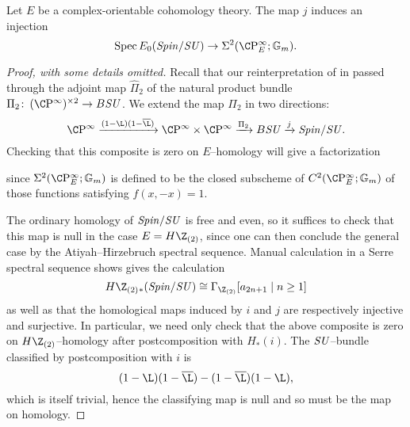 \begin{lemma}\label{SpinSUComparisonMapIsInj}
Let $E$ be a complex-orientable cohomology theory.  The map $j$ induces an injection \[\Spec E_0(\Spin/\SU) \to \Sigma^2(\CP^\infty_E; \Gm).\]
\end{lemma}
\begin{proof}[Proof, with some details omitted]
Recall that our reinterpretation of  in  passed through the adjoint map $\widehat \Pi_2$ of the natural product bundle $\Pi_2\co (\CP^\infty)^{\times 2} \to B\SU$.  We extend the map $\Pi_2$ in two directions: \[\CP^\infty \xrightarrow{(1 - \L)(1 - \overline{\L})} \CP^\infty \times \CP^\infty \xrightarrow{\Pi_2} B\SU \xrightarrow{j} \Spin/\SU.\]  Checking that this composite is zero on $E$--homology will give a factorization
\begin{center}
\end{center}
since $\Sigma^2(\CP^\infty_E; \Gm)$ is defined to be the closed subscheme of $C^2(\CP^\infty_E; \Gm)$ of those functions satisfying $f(x, -x) = 1$.

The ordinary homology of $\mathit{Spin}/\mathit{SU}$ is free and even, so it suffices to check that this map is null in the case $E = H\Z_{(2)}$, since one can then conclude the general case by the Atiyah--Hirzebruch spectral sequence.  Manual calculation in a Serre spectral sequence shows gives the calculation \[H\Z_{(2)}{}_*(\Spin/\SU) \cong \Gamma_{\Z_{(2)}}[a_{2n+1} \mid n \ge 1]\] as well as that the homological maps induced by $i$ and $j$ are respectively injective and surjective.  In particular, we need only check that the above composite is zero on $H\Z_{(2)}$--homology after postcomposition with $H_*(i)$.  The $\mathit{SU}$--bundle classified by postcomposition with $i$ is \[(1 - \L)(1 - \overline \L) - (1 - \overline \L)(1 - \L),\] which is itself trivial, hence the classifying map is null and so must be the map on homology.


\end{proof}
